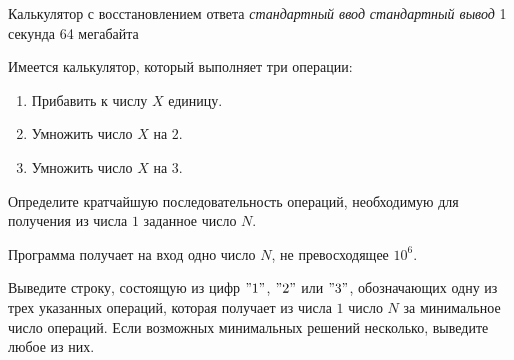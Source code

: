 \begin{problem}%
{Калькулятор с восстановлением ответа}%
{\textsl{стандартный ввод}}%
{\textsl{стандартный вывод}}%
{1 секунда}%
{64 мегабайта}%
{}

Имеется калькулятор, который выполняет три операции:
\begin{enumerate}
\item Прибавить к числу $X$ единицу.
\item Умножить число $X$ на $2$.
\item Умножить число $X$ на $3$.
\end{enumerate}

Определите кратчайшую последовательность операций, необходимую для получения из числа $1$ заданное число $N$.

\InputFile

Программа получает на вход одно число $N$, не превосходящее $10^6$.

\OutputFile

Выведите строку, состоящую из цифр $"1"$, $"2"$ или $"3"$, обозначающих одну из трех указанных операций, которая получает из числа $1$ число $N$ за минимальное число операций. Если возможных минимальных решений несколько, выведите любое из них.

\Examples

\begin{example}
%
%
%
\end{example}
\end{problem}